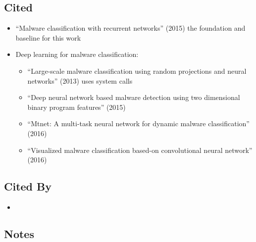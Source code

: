 \documentclass{article}
\begin{document}
\subsection*{Cited}
\begin{itemize}
\item ``Malware classification with recurrent networks'' (2015) the foundation and baseline for this work
\item Deep learning for malware classification:
	\begin{itemize}
	\item ``Large-scale malware classification using random projections and neural networks'' (2013) uses system calls
	\item ``Deep neural network based malware detection using two dimensional binary program features'' (2015)
	\item ``Mtnet: A multi-task neural network for dynamic malware classification'' (2016)
	\item ``Visualized malware classification based-on convolutional neural network'' (2016)
	\end{itemize}
\end{itemize}

\subsection*{Cited By}
\begin{itemize}
\item
\end{itemize}

\subsection*{Notes}
\end{document}
